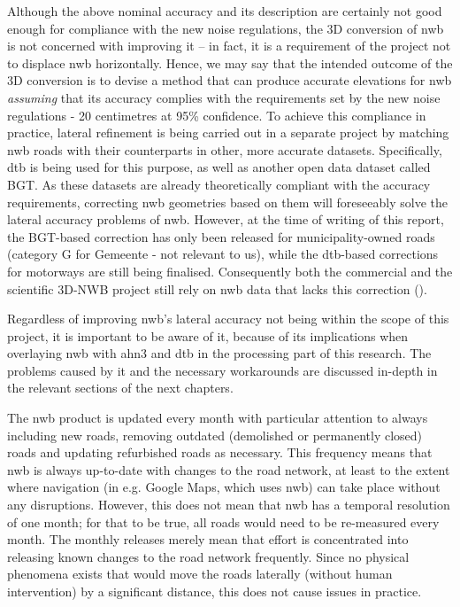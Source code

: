 Although the above nominal accuracy and its description are certainly not good enough for compliance with the new noise regulations, the 3D conversion of \ac{nwb} is not concerned with improving it – in fact, it is a requirement of the project not to displace \ac{nwb} horizontally. Hence, we may say that the intended outcome of the 3D conversion is to devise a method that can produce accurate elevations for \ac{nwb} \textit{assuming} that its accuracy complies with the requirements set by the new noise regulations - 20 centimetres at 95\% confidence. To achieve this compliance in practice, lateral refinement is being carried out in a separate project by matching \ac{nwb} roads with their counterparts in other, more accurate datasets. Specifically, \ac{dtb} is being used for this purpose, as well as another open data dataset called BGT. As these datasets are already theoretically compliant with the accuracy requirements, correcting \ac{nwb} geometries based on them will foreseeably solve the lateral accuracy problems of \ac{nwb}. However, at the time of writing of this report, the BGT-based correction has only been released for municipality-owned roads (category G for Gemeente - not relevant to us), while the \ac{dtb}-based corrections for motorways are still being finalised. Consequently both the commercial and the scientific 3D-NWB project still rely on \ac{nwb} data that lacks this correction (\cite{nwb_gecorrigeerd}).

Regardless of improving \ac{nwb}’s lateral accuracy not being within the scope of this project, it is important to be aware of it, because of its implications when overlaying \ac{nwb} with \ac{ahn3} and \ac{dtb} in the processing part of this research. The problems caused by it and the necessary workarounds are discussed in-depth in the relevant sections of the next chapters.

The \ac{nwb} product is updated every month with particular attention to always including new roads, removing outdated (demolished or permanently closed) roads and updating refurbished roads as necessary. This frequency means that \ac{nwb} is always up-to-date with changes to the road network, at least to the extent where navigation (in e.g. Google Maps, which uses \ac{nwb}) can take place without any disruptions. However, this does not mean that \ac{nwb} has a temporal resolution of one month; for that to be true, all roads would need to be re-measured every month. The monthly releases merely mean that effort is concentrated into releasing known changes to the road network frequently. Since no physical phenomena exists that would move the roads laterally (without human intervention) by a significant distance, this does not cause issues in practice.

